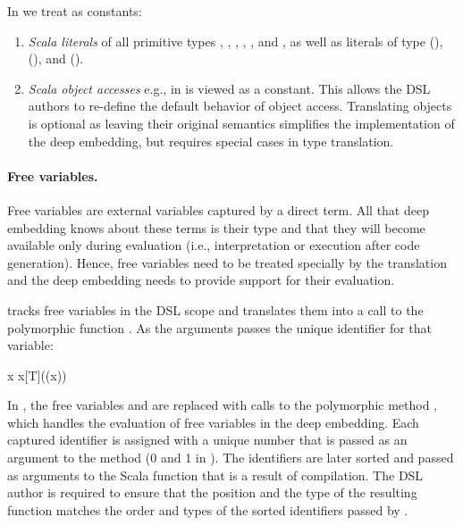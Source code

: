   In \yy we treat as constants:
  \begin{enumerate}

   \item \emph{Scala literals} of all primitive types , ,
     , , , and , as well as literals of
      type  (),  (\code{()}), and  ().

   \item \emph{Scala object accesses} e.g.,  in  is viewed as a constant. This allows
    the DSL authors to re-define the default behavior of object access. Translating objects is optional as
    leaving their original semantics simplifies the implementation of the deep embedding,
    but requires special cases in type translation.
  \end{enumerate}


\paragraph{Free variables.} Free variables are external variables captured by
  a direct \edsl{} term.  All that deep embedding knows about these terms is
  their type and that they will become available only during evaluation (i.e., interpretation or
  execution after code generation).  Hence, free variables need to be treated
  specially by the translation and the deep embedding needs to provide support
  for their evaluation.

  \yy tracks free variables in the DSL scope and translates them into a call to the polymorphic function . As the arguments
  \yy passes the unique identifier for that variable:

    \infyy{}
          { \quad x\;\;\;\;}
          {x}{[T]((x))}

  In , the free variables
   and  are replaced with calls to the polymorphic method
  , which handles the evaluation of free variables in the deep
  embedding. Each captured identifier is assigned with a unique number that
  is passed as an argument to the  method
   (0 and 1 in ).
  The identifiers are later sorted and passed as arguments to the Scala function that is a result
  of \edsl compilation. The DSL author is required to ensure that the position and the type
  of the resulting function matches the order and types of the sorted identifiers passed by \yy.

